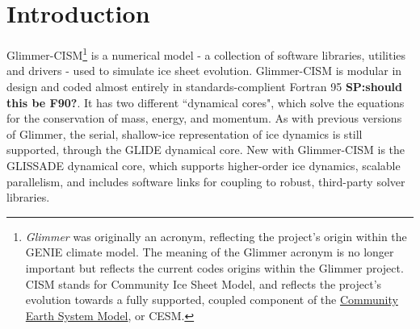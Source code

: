 
\section{Introduction}
%
Glimmer-CISM\footnote{{\it Glimmer} was originally an acronym, reflecting the project's origin within the GENIE climate model. The meaning of the Glimmer acronym is no longer important but reflects the current codes origins within the Glimmer project. CISM stands for Community Ice Sheet Model, and reflects the project's evolution towards a fully supported, coupled component of the \href{http://www2.cesm.ucar.edu/}{Community Earth System Model}, or CESM.} is a numerical model - a collection of software libraries, utilities and drivers  - used to simulate ice sheet evolution. Glimmer-CISM is modular in design and coded almost entirely in standards-complient Fortran 95 \textbf{SP:should this be F90?}. It has two different ``dynamical cores", which solve the equations for the conservation of mass, energy, and momentum. As with previous versions of Glimmer, the serial, shallow-ice representation of ice dynamics is still supported, through the GLIDE dynamical core. New with Glimmer-CISM is the GLISSADE dynamical core, which supports higher-order ice dynamics, scalable parallelism, and includes software links for coupling to robust, third-party solver libraries. 
%
